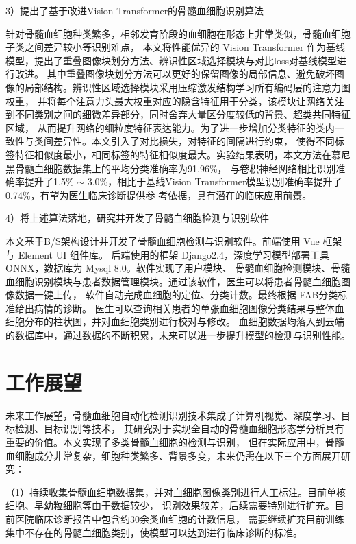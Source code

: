 3）提出了基于改进Vision Transformer的骨髓血细胞识别算法

针对骨髓血细胞种类繁多，相邻发育阶段的血细胞在形态上非常类似，骨髓血细胞子类之间差异较小等识别难点，
本文将性能优异的 Vision Transformer 作为基线模型，提出了重叠图像块划分方法、辨识性区域选择模块与对比loss对基线模型进行改进。
其中重叠图像块划分方法可以更好的保留图像的局部信息、避免破坏图像的局部结构。辨识性区域选择模块采用压缩激发结构学习所有编码层的注意力图权重，
并将每个注意力头最大权重对应的隐含特征用于分类，该模块让网络关注到不同类别之间的细微差异部分，同时舍弃大量区分度较低的背景、超类共同特征区域\cite{SWGC202206005}，
从而提升网络的细粒度特征表达能力。为了进一步增加分类特征的类内一致性与类间差异性。本文引入了对比损失，对特征的间隔进行约束，
使得不同标签特征相似度最小，相同标签的特征相似度最大。实验结果表明，本文方法在慕尼黑骨髓血细胞数据集上的平均分类准确率为91.96\%，
与卷积神经网络相比识别准确率提升了1.5\% $\sim$ 3.0\%，相比于基线Vision Transformer模型识别准确率提升了0.74\%，有望为医生临床诊断提供参
考依据，具有潜在的临床应用前景。

4）将上述算法落地，研究并开发了骨髓血细胞检测与识别软件

本文基于B/S架构设计并开发了骨髓血细胞检测与识别软件。前端使用 Vue 框架与 Element UI 组件库。
后端使用的框架 Django2.4，深度学习模型部署工具 ONNX，数据库为 Mysql 8.0。软件实现了用户模块、
骨髓血细胞检测模块、骨髓血细胞识别模块与患者数据管理模块。通过该软件，医生可以将患者骨髓血细胞图像数据一键上传，
软件自动完成血细胞的定位、分类计数。最终根据 FAB分类标准给出病情的诊断。
医生可以查询相关患者的单张血细胞图像分类结果与整体血细胞分布的柱状图，并对血细胞类别进行校对与修改。
血细胞数据均落入到云端的数据库中，通过数据的不断积累，未来可以进一步提升模型的检测与识别性能。

\section{工作展望}

未来工作展望，骨髓血细胞自动化检测识别技术集成了计算机视觉、深度学习、目标检测、目标识别等技术，
其研究对于实现全自动的骨髓血细胞形态学分析具有重要的价值。本文实现了多类骨髓血细胞的检测与识别，
但在实际应用中，骨髓血细胞成分非常复杂，细胞种类繁多、背景多变，未来仍需在以下三个方面展开研究：

（1）持续收集骨髓血细胞数据集，并对血细胞图像类别进行人工标注。目前单核细胞、早幼粒细胞等由于数据较少，
识别效果较差，后续需要特别进行扩充。目前医院临床诊断报告中包含约30余类血细胞的计数信息，
需要继续扩充目前训练集中不存在的骨髓血细胞类别，使模型可以达到进行临床诊断的标准。

